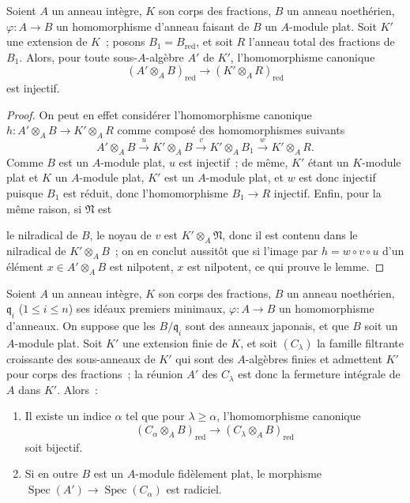 \begin{lemma}[23.2.3]
\label{0.23.2.3-fr}
Soient $A$ un anneau intègre, $K$ son corps des fractions, $B$ un anneau
noethérien, $\varphi:A\to B$ un homomorphisme d'anneau faisant de $B$ un
$A$-module plat. Soit $K'$ une extension de $K$~; posons
$B_1=B_{\mathrm{red}}$, et soit $R$ l'anneau total des fractions de $B_1$.
Alors, pour toute sous-$A$-algèbre $A'$ de $K'$, l'homomorphisme canonique
\begin{equation}
\label{0.23.1.8.1-fr}
  (A'\otimes_AB)_{\mathrm{red}}
  \longrightarrow(K'\otimes_AR)_{\mathrm{red}}
  \tag{23.1.8.1}
\end{equation}
est injectif.
\end{lemma}

\begin{proof}
On peut en effet considérer l'homomorphisme canonique
$h:A'\otimes_AB\to K'\otimes_AR$ comme composé des homomorphismes suivants
\[
  A'\otimes_AB\xrightarrow{u}K'\otimes_AB
  \xrightarrow{v}K'\otimes_AB_1\xrightarrow{w}K'\otimes_AR.
\]
Comme $B$ est un $A$-module plat, $u$ est injectif~; de même, $K'$ étant un
$K$-module plat et $K$ un $A$-module plat, $K'$ est un $A$-module plat, et
$w$ est donc injectif puisque $B_1$ est réduit, donc l'homomorphisme
$B_1\to R$ injectif. Enfin, pour la même raison, si $\mathfrak N$ est


le nilradical de $B$, le noyau de $v$ est $K'\otimes_A\mathfrak N$, donc il est
contenu dans le nilradical de $K'\otimes_AB$~; on en conclut aussitôt que si
l'image par $h=w\circ v\circ u$ d'un élément $x\in A'\otimes_AB$ est
nilpotent, $x$ est nilpotent, ce qui prouve le lemme.
\end{proof}

\begin{proposition}[23.2.4]
\label{0.23.2.4-fr}
Soient $A$ un anneau intègre, $K$ son corps des fractions, $B$ un anneau
noethérien, $\mathfrak q_i$ ($1\leqslant i\leqslant n$) ses idéaux premiers
minimaux, $\varphi:A\to B$ un homomorphisme d'anneaux. On suppose que les
$B/\mathfrak q_i$ sont des anneaux japonais, et que $B$ soit un $A$-module
plat. Soit $K'$ une extension finie de $K$, et soit $(C_\lambda)$ la famille
filtrante croissante des sous-anneaux de $K'$ qui sont des $A$-algèbres
finies et admettent $K'$ pour corps des fractions~; la réunion $A'$ des
$C_\lambda$ est donc la fermeture intégrale de $A$ dans $K'$. Alors~:
\begin{enumerate}
  \item[(i)] Il existe un indice $\alpha$ tel que pour $\lambda\geqslant
  \alpha$, l'homomorphisme canonique
  \begin{equation}
  \label{0.23.2.4.1-fr}
    (C_\alpha\otimes_AB)_{\mathrm{red}}
    \longrightarrow(C_\lambda\otimes_AB)_{\mathrm{red}}
    \tag{23.2.4.1}
  \end{equation}
  soit bijectif.
  \item[(ii)] Si en outre $B$ est un $A$-module fidèlement plat, le morphisme
  $\operatorname{Spec}(A')\to\operatorname{Spec}(C_\alpha)$ est radiciel.
\end{enumerate}
\end{proposition}

